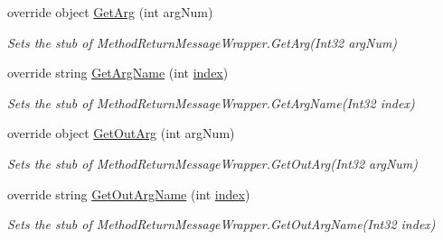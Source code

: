 \begin{DoxyCompactItemize}
override object \hyperlink{class_system_1_1_runtime_1_1_remoting_1_1_messaging_1_1_fakes_1_1_stub_method_return_message_wrapper_a5a19a84ccb55455500569f12e88021a3}{Get\-Arg} (int arg\-Num)
\begin{DoxyCompactList}\small\item\em Sets the stub of Method\-Return\-Message\-Wrapper.\-Get\-Arg(\-Int32 arg\-Num)\end{DoxyCompactList}\item 
override string \hyperlink{class_system_1_1_runtime_1_1_remoting_1_1_messaging_1_1_fakes_1_1_stub_method_return_message_wrapper_aba9b2eea384c7e512571b0f40e368771}{Get\-Arg\-Name} (int \hyperlink{jquery-1_810_82-vsdoc_8js_a75bb12d1f23302a9eea93a6d89d0193e}{index})
\begin{DoxyCompactList}\small\item\em Sets the stub of Method\-Return\-Message\-Wrapper.\-Get\-Arg\-Name(\-Int32 index)\end{DoxyCompactList}\item 
override object \hyperlink{class_system_1_1_runtime_1_1_remoting_1_1_messaging_1_1_fakes_1_1_stub_method_return_message_wrapper_a73ef2344cbdec1994e2b719c7e63cd30}{Get\-Out\-Arg} (int arg\-Num)
\begin{DoxyCompactList}\small\item\em Sets the stub of Method\-Return\-Message\-Wrapper.\-Get\-Out\-Arg(\-Int32 arg\-Num)\end{DoxyCompactList}\item 
override string \hyperlink{class_system_1_1_runtime_1_1_remoting_1_1_messaging_1_1_fakes_1_1_stub_method_return_message_wrapper_ac37f65ef1cf21d3e6b162fa21c64e312}{Get\-Out\-Arg\-Name} (int \hyperlink{jquery-1_810_82-vsdoc_8js_a75bb12d1f23302a9eea93a6d89d0193e}{index})
\begin{DoxyCompactList}\small\item\em Sets the stub of Method\-Return\-Message\-Wrapper.\-Get\-Out\-Arg\-Name(\-Int32 index)\end{DoxyCompactList}\end{DoxyCompactItemize}
